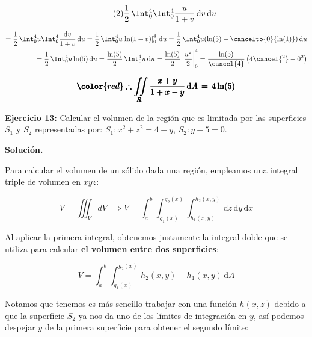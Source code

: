 \documentclass[12pt]{article}
\begin{document}
\begin{equation}\label{eqn:9-2}\tag{2}
	\frac{1}{2}\,\Int_0^4\Int_0^4 \frac{u}{1+v}\, \mathrm{d}v\,\mathrm{d}u
\end{equation}

\begin{align*}
	= \frac{1}{2}\,\Int_0^4 u \Int_0^4 \frac{\mathrm{d}v}{1+v}\, \mathrm{d}u
	= \frac{1}{2}\,\Int_0^4 u \left.\ln(1+v)\right|_0^4\, \mathrm{d}u = \frac{1}{2}\,\Int_0^4 u( \ln(5)-\cancelto{0}{\ln(1)})\, \mathrm{d}u \\
	= \frac{1}{2}\,\Int_0^4 u \ln(5)\, \mathrm{d}u = \frac{\ln(5)}{2}\,\Int_0^4 u\, \mathrm{d}u = \frac{\ln(5)}{2}\, \left.\frac{u^2}{2}\right|_0^4 = \frac{\ln(5)}{\cancel{4}}\left(4\cancel{^2}-0^2\right)
\end{align*}

\begin{align*}
	\pmb{\color{red} \therefore \iint\limits_R \frac{x+y}{1+x-y}\, \mathrm{d}A\, = \,4\ln(5)}
\end{align*}

\noindent \textbf{Ejercicio 13:} Calcular el volumen de la región que es limitada por las superficies $S_1$ y $S_2$ representadas por: $S_1:x^2+z^2=4-y$, $S_2:y+5=0$.

\vspace{5mm}

\noindent \textbf{Solución.}

\vspace{3mm}

\noindent Para calcular el volumen de un sólido dada una región, empleamos una integral triple de volumen en $xyz$:

\begin{equation}\label{eqn:13-1}\tag{1}
	V = \iiint_V dV \implies V = \int_{a}^{b}\int_{g_1(x)}^{g_2(x)}\int_{h_1(x,y)}^{h_2(x,y)}\, \mathrm{d}z\,\mathrm{d}y\,\mathrm{d}x
\end{equation}

\noindent Al aplicar la primera integral, obtenemos justamente la integral doble que se utiliza para calcular \textbf{el volumen entre dos superficies}:

\begin{equation}\label{eqn:13-2}\tag{2}
	V = \int_{a}^{b}\int_{g_1(x)}^{g_2(x)}\, h_2(x,y)-h_1(x,y)\, \mathrm{d}A
\end{equation}

\noindent Notamos que tenemos es más sencillo trabajar con una función $h(x,z)$ debido a que la superficie $S_2$ ya nos da uno de los límites de integración en $y$, así podemos despejar $y$ de la primera superficie para obtener el segundo límite:
\end{document}
